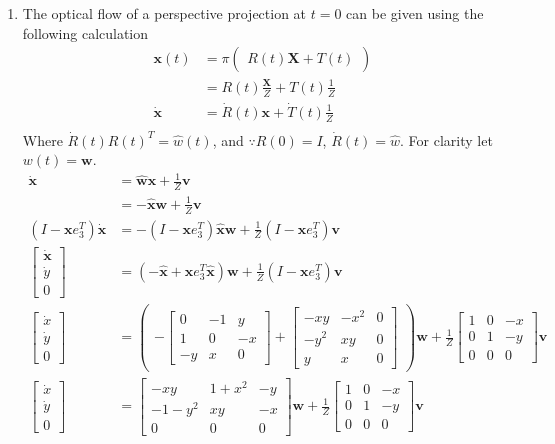 \documentclass[10pt]{article}
\def\0{\boldsymbol{0}}
\def\x{\boldsymbol{x}}
\def\v{\boldsymbol{v}}
\def\w{\boldsymbol{w}}
\def\X{\boldsymbol{X}}
\def\y{\boldsymbol{y}}
\begin{document}
\begin{enumerate}
\begin{enumerate}
\item The optical flow of a perspective projection at $t=0$ can be given using the following calculation
\begin{align*}
\x(t) &= \pi \begin{pmatrix}R(t)\X + T(t) \end{pmatrix} \\
&= R(t) \frac{\X}{Z} + T(t) \frac{1}{Z} \\
\dot{\x} &= \dot{R}(t) \x + \dot{T}(t) \frac{1}{Z} \\
\end{align*}
Where $\dot{R}(t)R(t)^T = \hat{w}(t)$, and $ \because R(0)=I$, $\dot{R}(t) = \hat{w}$. For clarity let $w(t) = \w$.
\begin{align*}
\dot{\x} &= \hat{\w}\x + \frac{1}{Z}\v\\
&= -\hat{\x}\w + \frac{1}{Z}\v\\
(I-\x e_3^T)\dot{\x} &= -(I-\x e_3^T)\hat{\x}\w + \frac{1}{Z}(I-\x e_3^T)\v\\
\begin{bmatrix} \dot{\x} \\ \dot{y} \\ 0 \end{bmatrix} &= (-\hat{\x} + \x e_3^T\hat{\x})\w + \frac{1}{Z}(I - \x e_3^T)\v \\
\begin{bmatrix} \dot{x} \\ \dot{y}  \\ 0 \end{bmatrix} &= \begin{pmatrix} -\begin{bmatrix}0&-1&y\\1&0&-x\\-y&x&0 \end{bmatrix} + \begin{bmatrix}-xy&-x^2&0\\-y^2&xy&0\\y&x&0\end{bmatrix} \end{pmatrix} \w + \frac{1}{Z} \begin{bmatrix} 1 & 0 & -x \\ 0& 1 & -y \\ 0&0&0 \end{bmatrix} \v\\
\begin{bmatrix} \dot{x} \\ \dot{y}  \\ 0 \end{bmatrix} &= \begin{bmatrix}-xy&1+x^2&-y\\-1-y^2&xy&-x\\0&0&0 \end{bmatrix} \w + \frac{1}{Z} \begin{bmatrix} 1 & 0 & -x \\ 0& 1 & -y \\ 0&0&0 \end{bmatrix} \v\\

\end{align*}
\end{enumerate}
\end{enumerate}
\end{document}

